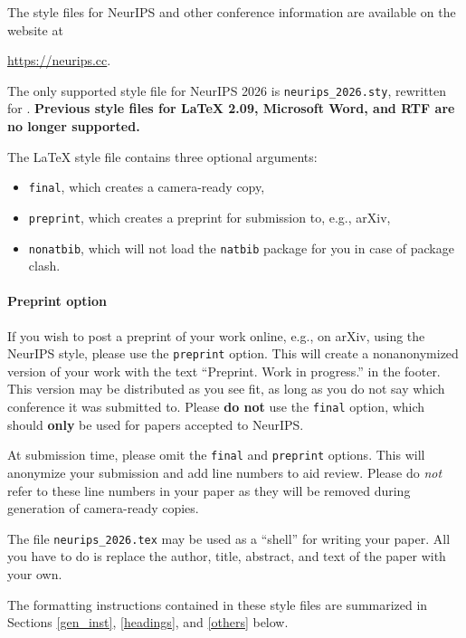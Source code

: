 \documentclass{article}
\begin{document}
The style files for NeurIPS and other conference information are available on the website at
\begin{center}
  \url{https://neurips.cc}.
\end{center}


The only supported style file for NeurIPS 2026 is \verb+neurips_2026.sty+, rewritten for \LaTeXe{}. \textbf{Previous style files for \LaTeX{} 2.09,  Microsoft Word, and RTF are no longer supported.}


The \LaTeX{} style file contains three optional arguments: 
\begin{itemize}
\item \verb+final+, which creates a camera-ready copy, 
\item \verb+preprint+, which creates a preprint for submission to, e.g., arXiv, \item \verb+nonatbib+, which will not load the \verb+natbib+ package for you in case of package clash.
\end{itemize}


\paragraph{Preprint option}
If you wish to post a preprint of your work online, e.g., on arXiv, using the NeurIPS style, please use the \verb+preprint+ option. This will create a nonanonymized version of your work with the text ``Preprint. Work in progress.'' in the footer. This version may be distributed as you see fit, as long as you do not say which conference it was submitted to. Please \textbf{do not} use the \verb+final+ option, which should \textbf{only} be used for papers accepted to NeurIPS.


At submission time, please omit the \verb+final+ and \verb+preprint+ options. This will anonymize your submission and add line numbers to aid review. Please do \emph{not} refer to these line numbers in your paper as they will be removed during generation of camera-ready copies.


The file \verb+neurips_2026.tex+ may be used as a ``shell'' for writing your paper. All you have to do is replace the author, title, abstract, and text of the paper with your own.


The formatting instructions contained in these style files are summarized in Sections \ref{gen_inst}, \ref{headings}, and \ref{others} below.
\end{document}
